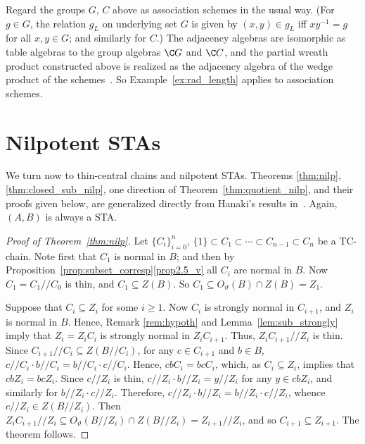 \begin{rema}
\label{rem:rad_length} 
Regard the groups $G$, $C$ above as association
schemes in the usual way. (For $g \in G$, the relation $g_L$ on
underlying set $G$ is given by $(x, y) \in g_L$ iff $xy^{-1} = g$ for
all $x, y \in G$; and similarly for $C$.) The adjacency algebras are
isomorphic as table algebras to the group algebras ${\C}G$ and ${\C}C$,
and the partial wreath product constructed above is realized as the
adjacency algebra of the wedge product of the schemes~\cite [Section~3]{M}. 
 So Example~\ref{ex:rad_length} applies to
association schemes.
\end{rema}



\section{Nilpotent STAs}\label{sect5}

We turn now to thin-central chains and nilpotent STAs. Theorems
\ref{thm:nilp}, \ref{thm:closed_sub_nilp}, one direction of Theorem~\ref{thm:quotient_nilp}, and
their proofs given below, are generalized directly from Hanaki's results
in~\cite {H}. Again, 
$(A, B)$ is always a STA.

\begin{proof} [Proof of Theorem~\ref{thm:nilp}]
Let $\{C_i\}_{i=0}^n$, $\{1\} \subset C_1 \subset \cdots \subset C_{n-1}
\subset C_n$ be a TC-chain. Note first that $C_1$ is normal in $B$; and
then by Proposition~\ref{prop:subset_corresp}\ref{prop2.5_v} all $C_i$ are normal
in $B$. Now $C_1 = C_1//C_0$ is thin, and $C_1 \subseteq Z(B)$. So
$C_1 \subseteq O_{\vartheta}(B)\cap Z(B) = Z_1$. 

Suppose that $C_i \subseteq Z_i$ for some $i \geq 1$. Now $C_i$ is
strongly normal in $C_{i+1}$, and $Z_i$ is normal in $B$. Hence, Remark
\ref{rem:hypoth} and Lemma~\ref{lem:sub_strongly} imply that $Z_i =
Z_iC_i$ is strongly normal in $Z_iC_{i+1}$. Thus, $Z_iC_{i+1}//Z_i$ is thin.
Since $C_{i+1}//C_i \subseteq Z(B//C_i)$, for any $c \in C_{i+1}$ and $b
\in B$, $c//C_i\cdot b//C_i = b//C_i\cdot c//C_i$. Hence, $cbC_i = bcC_i$, which,
as $C_i \subseteq Z_i$, implies that $cbZ_i = bcZ_i$. Since $c//Z_i$ is
thin, $c//Z_i\cdot b//Z_i = y//Z_i$ for any $y \in cbZ_i$, and similarly
for $b//Z_i\cdot c//Z_i$. Therefore, 
$c//Z_i\cdot b//Z_i = b//Z_i\cdot c//Z_i$, whence $c//Z_i \in Z(B//Z_i)$. Then
$Z_iC_{i+1}//Z_i \subseteq O_{\vartheta}(B//Z_i)\cap Z(B//Z_i) =
Z_{i+1}//Z_i$, and so $C_{i+1} \subseteq Z_{i+1}$. The theorem follows.
\end{proof} 

